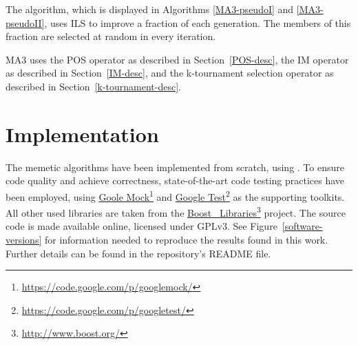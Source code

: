 \documentclass[thesis.tex]{subfiles}
\begin{document}


The algorithm, which is displayed in Algorithms \vref{MA3-pseudoI} and \vref{MA3-pseudoII}, uses \gls{ILS} to improve a fraction of each generation. The members of this fraction are selected at random in every iteration.

\gls{MA3} uses the \gls{POS} operator as described in Section~\ref{POS-desc}, the \gls{IM} operator as described in Section~\ref{IM-desc}, and the k-tournament selection operator as described in Section~\ref{k-tournament-desc}.




\section{Implementation}
The memetic algorithms have been implemented from scratch, using \Cpp. To ensure code quality and achieve correctness, state-of-the-art code testing practices have been employed, using \href{https://code.google.com/p/googlemock/}{Goole Mock}\footnote{\url{https://code.google.com/p/googlemock/}} and \href{https://code.google.com/p/googletest/}{Google Test}\footnote{\url{https://code.google.com/p/googletest/}} as the supporting toolkits. All other used libraries are taken from the \href{http://www.boost.org/}{Boost \Cpp\ Libraries}\footnote{\url{http://www.boost.org/}} project.
The source code is made available online, licensed under GPLv3. See Figure~\ref{software-versions} for information needed to reproduce the results found in this work. Further details can be found in the repository's README file.
\end{document}
